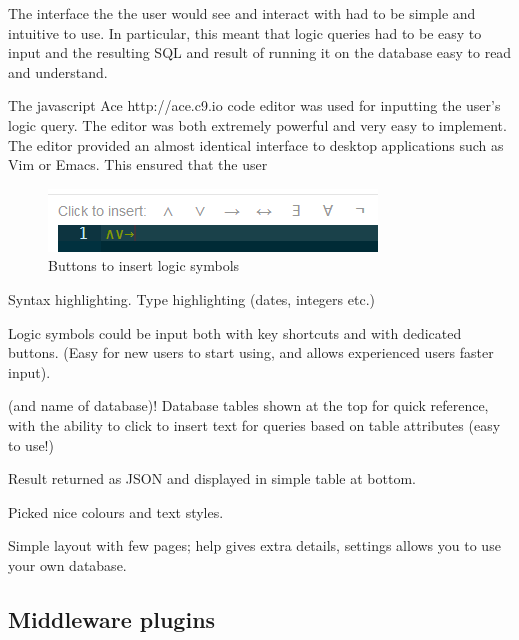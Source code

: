 \documentclass[a4paper, 11pt]{article}
\begin{document}
      The interface the the user would see and interact with had to be simple
      and intuitive to use. In particular, this meant that logic queries had to
      be easy to input and the resulting SQL and result of running it on the
      database easy to read and understand.

      The javascript Ace http://ace.c9.io code editor was used for inputting the
      user's
      logic query. The editor was both extremely powerful and very easy to
      implement. The editor provided an almost identical interface to desktop
      applications such as Vim or Emacs. This ensured that the user 

      \begin{figure}[h]
        \centering
        \includegraphics[]{Images/LogicSymbols.png}
        \caption{Buttons to insert logic symbols}
      \end{figure}

      Syntax highlighting. Type highlighting (dates, integers etc.)

      Logic symbols could be input both with key shortcuts and with dedicated
      buttons. (Easy for new users to start using, and allows experienced users
      faster input).

      (and name of database)!
      Database tables shown at the top for quick reference, with the ability to
      click to insert text for queries based on table attributes (easy to use!)

      Result returned as JSON and displayed in simple table at bottom.

      Picked nice colours and text styles.

      Simple layout with few pages; help gives extra details, settings allows
      you to use your own database.
 

  \subsection{Middleware plugins}
\end{document}
